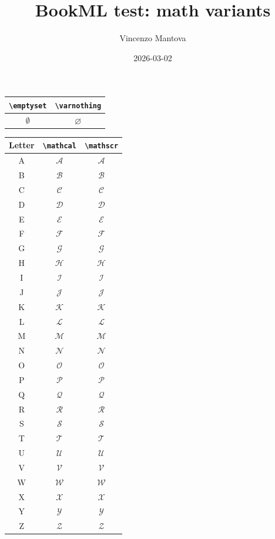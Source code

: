 \documentclass{article}
\title{BookML test: math variants}
\author{Vincenzo Mantova}
\date{2026-03-02}
\begin{document}
\begin{tabular}{c|c}
  \verb|\emptyset| & \verb|\varnothing| \\ \hline
  $\emptyset$      & $\varnothing$
\end{tabular}

\begin{tabular}{c|c|c}
  Letter & \verb|\mathcal| & \verb|\mathscr| \\ \hline
  A      & $\mathcal{A}$   & $\mathscr{A}$ \\
  B      & $\mathcal{B}$   & $\mathscr{B}$ \\
  C      & $\mathcal{C}$   & $\mathscr{C}$ \\
  D      & $\mathcal{D}$   & $\mathscr{D}$ \\
  E      & $\mathcal{E}$   & $\mathscr{E}$ \\
  F      & $\mathcal{F}$   & $\mathscr{F}$ \\
  G      & $\mathcal{G}$   & $\mathscr{G}$ \\
  H      & $\mathcal{H}$   & $\mathscr{H}$ \\
  I      & $\mathcal{I}$   & $\mathscr{I}$ \\
  J      & $\mathcal{J}$   & $\mathscr{J}$ \\
  K      & $\mathcal{K}$   & $\mathscr{K}$ \\
  L      & $\mathcal{L}$   & $\mathscr{L}$ \\
  M      & $\mathcal{M}$   & $\mathscr{M}$ \\
  N      & $\mathcal{N}$   & $\mathscr{N}$ \\
  O      & $\mathcal{O}$   & $\mathscr{O}$ \\
  P      & $\mathcal{P}$   & $\mathscr{P}$ \\
  Q      & $\mathcal{Q}$   & $\mathscr{Q}$ \\
  R      & $\mathcal{R}$   & $\mathscr{R}$ \\
  S      & $\mathcal{S}$   & $\mathscr{S}$ \\
  T      & $\mathcal{T}$   & $\mathscr{T}$ \\
  U      & $\mathcal{U}$   & $\mathscr{U}$ \\
  V      & $\mathcal{V}$   & $\mathscr{V}$ \\
  W      & $\mathcal{W}$   & $\mathscr{W}$ \\
  X      & $\mathcal{X}$   & $\mathscr{X}$ \\
  Y      & $\mathcal{Y}$   & $\mathscr{Y}$ \\
  Z      & $\mathcal{Z}$   & $\mathscr{Z}$
\end{tabular}
\end{document}
